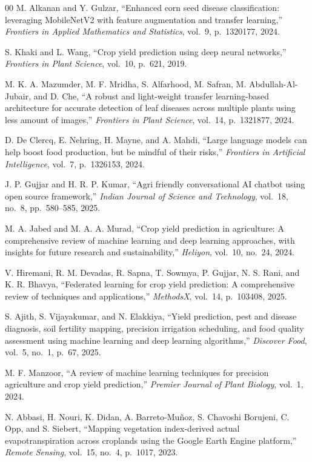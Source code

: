 \documentclass[conference]{IEEEtran}
\begin{document}
\begin{thebibliography}{00}
 M. Alkanan and Y. Gulzar, ``Enhanced corn seed disease classification: leveraging MobileNetV2 with feature augmentation and transfer learning,'' \textit{Frontiers in Applied Mathematics and Statistics}, vol.~9, p.~1320177, 2024.

 S. Khaki and L. Wang, ``Crop yield prediction using deep neural networks,'' \textit{Frontiers in Plant Science}, vol.~10, p.~621, 2019.

 M. K. A. Mazumder, M. F. Mridha, S. Alfarhood, M. Safran, M. Abdullah-Al-Jubair, and D. Che, ``A robust and light-weight transfer learning-based architecture for accurate detection of leaf diseases across multiple plants using less amount of images,'' \textit{Frontiers in Plant Science}, vol.~14, p.~1321877, 2024.

 D. De Clercq, E. Nehring, H. Mayne, and A. Mahdi, ``Large language models can help boost food production, but be mindful of their risks,'' \textit{Frontiers in Artificial Intelligence}, vol.~7, p.~1326153, 2024.

 J. P. Gujjar and H. R. P. Kumar, ``Agri friendly conversational AI chatbot using open source framework,'' \textit{Indian Journal of Science and Technology}, vol.~18, no.~8, pp.~580--585, 2025.

 M. A. Jabed and M. A. A. Murad, ``Crop yield prediction in agriculture: A comprehensive review of machine learning and deep learning approaches, with insights for future research and sustainability,'' \textit{Heliyon}, vol.~10, no.~24, 2024.

 V. Hiremani, R. M. Devadas, R. Sapna, T. Sowmya, P. Gujjar, N. S. Rani, and K. R. Bhavya, ``Federated learning for crop yield prediction: A comprehensive review of techniques and applications,'' \textit{MethodsX}, vol.~14, p.~103408, 2025.

 S. Ajith, S. Vijayakumar, and N. Elakkiya, ``Yield prediction, pest and disease diagnosis, soil fertility mapping, precision irrigation scheduling, and food quality assessment using machine learning and deep learning algorithms,'' \textit{Discover Food}, vol.~5, no.~1, p.~67, 2025.

 M. F. Manzoor, ``A review of machine learning techniques for precision agriculture and crop yield prediction,'' \textit{Premier Journal of Plant Biology}, vol.~1, 2024.

 N. Abbasi, H. Nouri, K. Didan, A. Barreto-Mu\~{n}oz, S. Chavoshi Borujeni, C. Opp, and S. Siebert, ``Mapping vegetation index-derived actual evapotranspiration across croplands using the Google Earth Engine platform,'' \textit{Remote Sensing}, vol.~15, no.~4, p.~1017, 2023.


\end{thebibliography}
\end{document}
